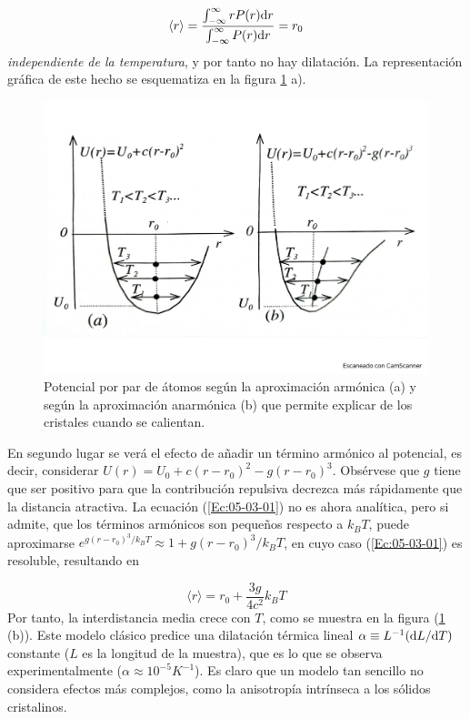 \begin{equation}
    \langle r \rangle = \frac{\int_{-\infty}^{\infty} r P(r)\mathrm{d} r}{\int_{-\infty}^{\infty} P(r)\mathrm{d} r} = r_0 \label{Ec:05-03-01}
\end{equation}
\textit{independiente de la temperatura}, y por tanto no hay dilatación. La representación gráfica de este hecho se esquematiza en la figura \ref{Fig:05-05} a). 

\begin{figure}[h!] \centering
    \includegraphics[scale=0.37]{Cuerpo/Ch_05/Fotos libro 5.pdf}
    \caption{Potencial por par de átomos según la aproximación armónica (a) y según la aproximación anarmónica (b) que permite explicar de los cristales cuando se calientan.}
    \label{Fig:05-05}
\end{figure}    

En segundo lugar se verá el efecto de añadir un término armónico al potencial, es decir, considerar $U(r) = U_0 + c(r-r_0)^2 - g(r-r_0)^3$. Obsérvese que $g$ tiene que ser positivo para que la contribución repulsiva decrezca más rápidamente que la distancia atractiva. La ecuación (\ref{Ec:05-03-01}) no es ahora analítica, pero si admite, que los términos armónicos son pequeños respecto a $k_BT$, puede aproximarse $e^{g(r-r_0)^3/k_BT} \approx 1 + g(r-r_0)^3 / k_BT$, en cuyo caso (\ref{Ec:05-03-01}) es resoluble, resultando en

\begin{equation}
    \langle r \rangle = r_0 + \frac{3g}{4c^2} k_B T
\end{equation}
Por tanto, la interdistancia media crece con $T$, como se muestra en la figura (\ref{Fig:05-05} (b)). Este modelo clásico predice una dilatación térmica lineal $\alpha \equiv L^{-1} (\mathrm{d} L / \mathrm{d} T)$ constante ($L$ es la longitud de la muestra), que es lo que se observa experimentalmente ($\alpha \approx 10^{-5} \unit{K^{-1}}$). Es claro que un modelo tan sencillo no considera efectos más complejos, como la anisotropía intrínseca a los sólidos cristalinos.

